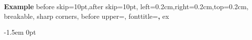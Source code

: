 \usepackage[most]{tcolorbox}
  {\textbf{Example}}
  {%
    before skip=10pt,after skip=10pt,
    left=0.2cm,right=0.2cm,top=0.2cm,
    breakable,
    sharp corners,
    before upper=\setlength{\parskip}{8pt},
    fonttitle=\bfseries,
  }%
  {ex}%

\newcommand{\tcbfootnote}[1]{\footnotemark \margintag{\textsuperscript{\tiny\arabic{footnote}} #1}}

\let\marginnote\relax
\usepackage{marginnote}
\newcommand{\margintag}[1]{
    \checkoddpage
    \ifoddpage
      {\marginnote{\footnotesize #1}}
    \else
      {\reversemarginpar\marginnote{\footnotesize #1}}
    \fi}

\makeatletter
{}
\makeatother

\makeatletter
{}
\makeatother

\usepackage{etoolbox}
\makeatletter
\patchcmd{\@algocf@start}%
  {-1.5em}%
  {0pt}%
  {}{}%
\makeatother

\allowdisplaybreaks
